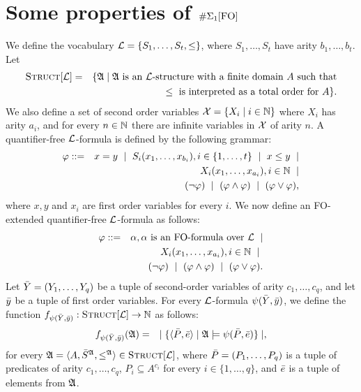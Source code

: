 \section{Some properties of $\E1$}

We define the vocabulary $\L = \{ S_1,\dots,S_t, \leq \}$, where $S_1,\dots,S_t$ have arity $b_1,\dots,b_t$. Let
\begin{eqnarray*}
	\Truc &=& \{\A \mid \A \text{ is an } \L \text{-structure with a finite domain } A \text{ such that} \\
	&& \leq \text{ is interpreted as a total order for } A \}.
\end{eqnarray*}
We also define a set of second order variables ${\cal X} = \{ X_i \mid i\in\N \}$ where $X_i$ has arity $a_i$, and for every $n \in \N$ there are infinite variables in ${\cal X}$ of arity $n$. A quantifier-free $\L$-formula is defined by the following grammar:
\begin{eqnarray*}
	\varphi &::=& x = y \ \mid \ S_i(x_1,\dots,x_{b_i}), i \in \{1,\dots,t\} \ \mid \ x \leq y \ \mid \\
	&& X_i(x_1,\dots,x_{a_i}), i\in\N \ \mid \\ 
	&& (\neg \varphi) \ \mid \ (\varphi \wedge \varphi) \ \mid \ (\varphi \vee \varphi),
\end{eqnarray*}
where $x,y$ and $x_i$ are first order variables for every $i$. We now define an {\sc FO}-extended quantifier-free $\L$-formula as follows:
\begin{eqnarray*}
	\varphi &::=& \alpha, \alpha \text{ is an FO-formula over } \L  \ \mid \\
	&& X_i(x_1,\dots,x_{a_i}), i\in\N \ \mid \ \\
	&& (\neg \varphi) \ \mid \ (\varphi \wedge \varphi) \ \mid \ (\varphi \vee \varphi).
\end{eqnarray*}
Let $\Y = (Y_1,\dots,Y_q)$ be a tuple of second-order variables of arity $c_1,\ldots,c_q$, and let $\y$ be a tuple of first order variables. For every $\L$-formula $\psi(\Y,\y)$, we define the function $f_{\psi(\Y,\y)}:\Truc \to \N$ as follows:
\begin{eqnarray*}
	f_{\psi(\Y,\y)}(\A) &=& \mid \{ \langle \P, \e \rangle \mid \A \models \psi(\P,\e) \} \mid,
\end{eqnarray*}
for every $\A = \langle A, \S^{\A}, \leq^{\A} \rangle \in \Truc$, where $\P = (P_1,\ldots,P_q)$ is a tuple of predicates of arity $c_1,\ldots,c_q$, $P_i \subseteq A^{c_i}$ for every $i \in \{1,\ldots,q\}$, and $\e$ is a tuple of elements from $\A$.\\

